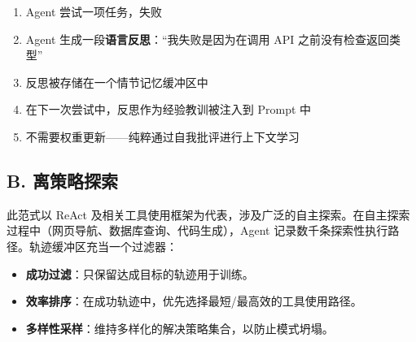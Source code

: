 \begin{keybox}
\begin{enumerate}
  \item Agent 尝试一项任务，失败
  \item Agent 生成一段\textbf{语言反思}：``我失败是因为在调用 API 之前没有检查返回类型''
  \item 反思被存储在一个情节记忆缓冲区中
  \item 在下一次尝试中，反思作为经验教训被注入到 Prompt 中
  \item 不需要权重更新——纯粹通过自我批评进行上下文学习
\end{enumerate}
\end{keybox}

\subsection{B. 离策略探索}
\label{b.-off-policy-exploration-react-tool-use-frameworks}

此范式以 ReAct \cite{yao2023react} 及相关工具使用框架为代表，涉及广泛的自主探索。在自主探索过程中（网页导航、数据库查询、代码生成），Agent 记录数千条探索性执行路径。轨迹缓冲区充当一个过滤器：

\begin{itemize}
  \item \textbf{成功过滤}：只保留达成目标的轨迹用于训练。
  \item \textbf{效率排序}：在成功轨迹中，优先选择最短/最高效的工具使用路径。
  \item \textbf{多样性采样}：维持多样化的解决策略集合，以防止模式坍塌。
\end{itemize}

